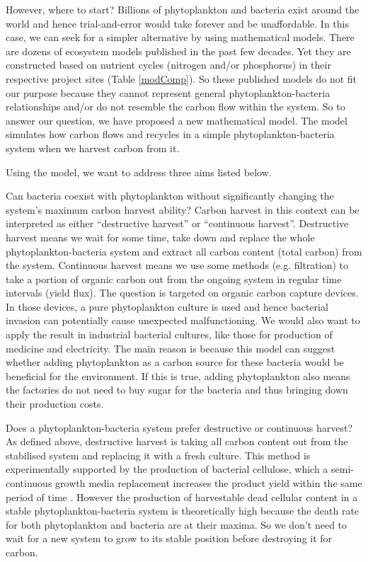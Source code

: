 \documentclass[../thesis.tex]{subfiles} %
\begin{document}
However, where to start?  Billions of phytoplankton and bacteria exist around the world and hence trial-and-error would take forever and be unaffordable.  In this case, we can seek for a simpler alternative by using mathematical models.  There are dozens of ecosystem models published in the past few decades.  Yet they are constructed based on nutrient cycles (nitrogen and/or phosphorus) in their respective project sites (Table \ref{modComp}).  So these published models do not fit our purpose because they cannot represent general phytoplankton-bacteria relationships and/or do not resemble the carbon flow within the system.  So to answer our question, we have proposed a new mathematical model.  The model simulates how carbon flows and recycles in a simple phytoplankton-bacteria system when we harvest carbon from it.

Using the model, we want to address three aims listed below.

Can bacteria coexist with phytoplankton without significantly changing the system’s maximum carbon harvest ability?  Carbon harvest in this context can be interpreted as either ``destructive harvest” or ``continuous harvest”.  Destructive harvest means we wait for some time, take down and replace the whole phytoplankton-bacteria system and extract all carbon content (total carbon) from the system.  Continuous harvest means we use some methods (e.g. filtration) to take a portion of organic carbon out from the ongoing system in regular time intervals (yield flux).  The question is targeted on organic carbon capture devices.  In those devices, a pure phytoplankton culture is used \autocite{evanson_2019} and hence bacterial invasion can potentially cause unexpected malfunctioning.  We would also want to apply the result in industrial bacterial cultures, like those for production of medicine and electricity.  The main reason is because this model can suggest whether adding phytoplankton as a carbon source for these bacteria would be beneficial for the environment.  If this is true, adding phytoplankton also means the factories do not need to buy sugar for the bacteria and thus bringing down their production costs.

Does a phytoplankton-bacteria system prefer destructive or continuous harvest?  As defined above, destructive harvest is taking all carbon content out from the stabilised system and replacing it with a fresh culture.  This method is experimentally supported by the production of bacterial cellulose, which a semi-continuous growth media replacement increases the product yield within the same period of time \autocite{aytekin2016statistical}.  However the production of harvestable dead cellular content in a stable phytoplankton-bacteria system is theoretically high because the death rate for both phytoplankton and bacteria are at their maxima.  So we don’t need to wait for a new system to grow to its stable position before destroying it for carbon.
\end{document}
